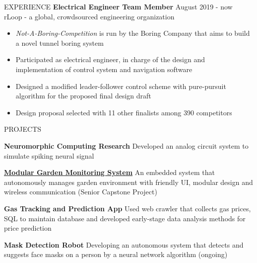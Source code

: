 \documentclass{../lib/resume} %
\begin{document}
\begin{rSection}{EXPERIENCE}
    \textbf{Electrical Engineer Team Member} \hfill August 2019 - now
    \\	rLoop - a global, crowdsourced engineering organization \hfill \textit{}
    \begin{itemize}
        \itemsep -4pt {}
        \item \textit{Not-A-Boring-Competition} is run by the Boring Company that aims to build a novel tunnel boring system
        \item Participated as electrical engineer, in charge of the design and implementation of control system and navigation software
        \item Designed a modified leader-follower control scheme with pure-pursuit algorithm for the proposed final design draft
        \item Design proposal selected with 11 other finalists among 390 competitors
    \end{itemize}



\end{rSection}


\begin{rSection}{PROJECTS}
    \vspace{-1em}

    \item \textbf{Neuromorphic Computing Research} {Developed an analog circuit system to simulate spiking neural signal}

    \item \href{https://github.com/liu2z2/mgms}{\textbf{Modular Garden Monitoring System}} {An embedded system that autonomously manages garden environment with friendly UI, modular design and wireless communication (Senior Capstone Project)}

    \item \textbf{Gas Tracking and Prediction App} {Used web crawler that collects gas prices, SQL to maintain database and developed early-stage data analysis methods for price prediction}

    \item \textbf{Mask Detection Robot} {Developing an autonomous system that detects and suggests face masks on a person by a neural network algorithm (ongoing)}


\end{rSection}
\end{document}
